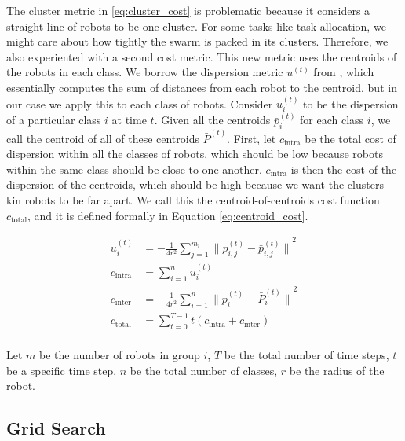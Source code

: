 \documentclass[conference]{IEEEtran}
\begin{document}
    The cluster metric in \eqref{eq:cluster_cost} is problematic because it considers a straight line of robots to be one cluster. For some tasks like task allocation, we might care about how tightly the swarm is packed in its clusters. Therefore, we also experiented with a second cost metric. This new metric uses the centroids of the robots in each class. We borrow the dispersion metric $u^{(t)}$ from \cite{gauci_self-organized_2014}, which essentially computes the sum of distances from each robot to the centroid, but in our case we apply this to each class of robots. Consider $u_i^{(t)}$ to be the dispersion of a particular class $i$ at time $t$. Given all the centroids $\bar{p}_i^{(t)}$ for each class $i$, we call the centroid of all of these centroids $\bar{P}^{(t)}$. First, let $c_{\text{intra}}$ be the total cost of dispersion within all the classes of robots, which should be low because robots within the same class should be close to one another. $c_{\text{intra}}$ is then the cost of the dispersion of the centroids, which should be high because we want the clusters kin robots to be far apart. We call this the centroid-of-centroids cost function $c_{\text{total}}$, and it is defined formally in Equation \eqref{eq:centroid_cost}.

    \begin{equation} \label{eq:centroid_cost}
      \begin{split}
        u_i^{(t)} &= -\frac{1} {4r^2}\sum_{j=1}^{m_{i}}{\lVert p_{i,j}^{(t)} - \bar{p}_{i,j}^{(t)} \rVert}^2 \\
        c_{\text{intra}} &= \sum_{i=1}^n u_i^{(t)} \\
        c_{\text{inter}} &= -\frac{1} {4r^2}\sum_{i=1}^n{\lVert \bar{p}_i^{(t)} - \bar{P}_i^{(t)} \rVert}^2 \\
        c_{\text{total}} &=  \sum_{t=0}^{T-1} t (c_{\text{intra}} + c_{\text{inter}}) \\
      \end{split}
    \end{equation}

    Let $m$ be the number of robots in group $i$, $T$ be the total number of time steps, $t$ be a specific time step, $n$ be the total number of classes, $r$ be the radius of the robot.

  \subsection{Grid Search}
\end{document}
